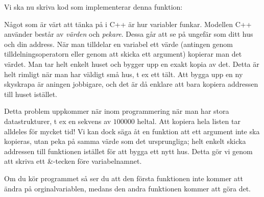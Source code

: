 Vi ska nu skriva kod som implementerar denna funktion:



Något som är värt att tänka på i C++ är hur variabler funkar. Modellen C++ använder består av \emph{värden} och \emph{pekare}. Dessa går att se på ungefär som ditt hus och din address. När man tilldelar en variabel ett värde (antingen genom tilldelningsoperatorn eller genom att skicka ett argument) kopierar man det värdet. Man tar helt enkelt huset och bygger upp en exakt kopia av det. Detta är helt rimligt när man har väldigt små hus, t ex ett tält. Att bygga upp en ny skyskrapa är aningen jobbigare, och det är då enklare att bara kopiera addressen till huset istället.

Detta problem uppkommer när inom programmering när man har stora datastrukturer, t ex en sekvens av $100 000$ heltal. Att kopiera hela listen tar alldeles för mycket tid! Vi kan dock säga åt en funktion att ett argument inte ska kopieras, utan peka på samma värde som det ursprungliga; helt enkelt skicka addressen till funktionen istället för att bygga ett nytt hus. Detta gör vi genom att skriva ett \&-tecken före variabelnamnet. 



Om du kör programmet så ser du att den första funktionen inte kommer att ändra på orginalvariablen, medans den andra funktionen kommer att göra det.
